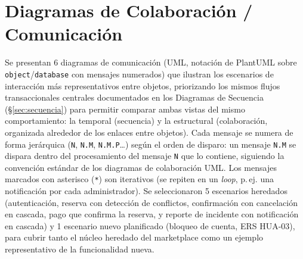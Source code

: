 
\section{Diagramas de Colaboración / Comunicación}
\sloppy
\noindent Se presentan 6 diagramas de comunicación (UML, notación de PlantUML sobre \texttt{object}/\texttt{database} con mensajes numerados) que ilustran los escenarios de interacción más representativos entre objetos, priorizando los mismos flujos transaccionales centrales documentados en los Diagramas de Secuencia (\S\ref{sec:secuencia}) para permitir comparar ambas vistas del mismo comportamiento: la temporal (secuencia) y la estructural (colaboración, organizada alrededor de los enlaces entre objetos). Cada mensaje se numera de forma jerárquica (\texttt{N}, \texttt{N.M}, \texttt{N.M.P}\ldots) según el orden de disparo: un mensaje \texttt{N.M} se dispara dentro del procesamiento del mensaje \texttt{N} que lo contiene, siguiendo la convención estándar de los diagramas de colaboración UML. Los mensajes marcados con asterisco (\texttt{*}) son iterativos (se repiten en un \textit{loop}, p.\,ej. una notificación por cada administrador). Se seleccionaron 5 escenarios heredados (autenticación, reserva con detección de conflictos, confirmación con cancelación en cascada, pago que confirma la reserva, y reporte de incidente con notificación en cascada) y 1 escenario nuevo planificado (bloqueo de cuenta, ERS HUA-03), para cubrir tanto el núcleo heredado del marketplace como un ejemplo representativo de la funcionalidad nueva.

